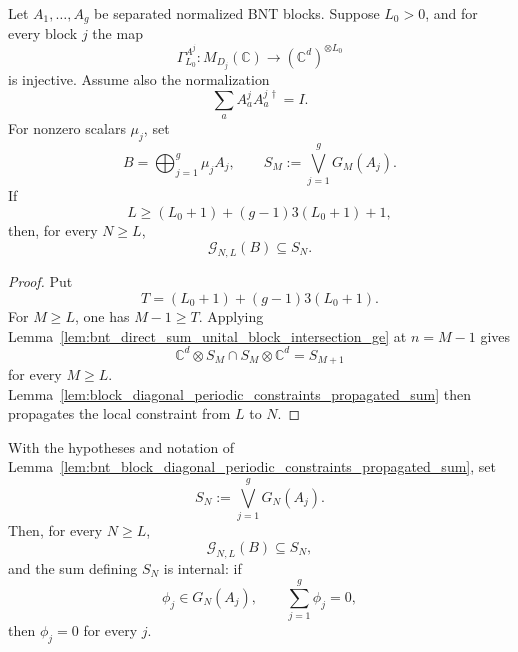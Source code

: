 \begin{lemma}
    \label{lem:bnt_block_diagonal_periodic_constraints_propagated_sum}
    \leanok
    Let \(A_1,\ldots,A_g\) be separated normalized BNT blocks. Suppose
    \(L_0>0\), and for every block \(j\) the map
    \[
        \Gamma_{L_0}^{A^j}:M_{D_j}(\mathbb C)\to
        (\mathbb C^d)^{\otimes L_0}
    \]
    is injective. Assume also the normalization
    \[
        \sum_a A^j_aA^{j\,\dagger}_a=I .
    \]
    For nonzero scalars \(\mu_j\), set
    \[
        B=\bigoplus_{j=1}^g\mu_jA_j,
        \qquad
        S_M:=\bigvee_{j=1}^gG_M(A_j).
    \]
    If
    \[
        L\ge (L_0+1)+(g-1)3(L_0+1)+1,
    \]
    then, for every \(N\ge L\),
    \[
        \mathcal G_{N,L}(B)\subseteq S_N.
    \]
\end{lemma}

\begin{proof}
    \leanok
    Put
    \[
        T=(L_0+1)+(g-1)3(L_0+1).
    \]
    For \(M\ge L\), one has \(M-1\ge T\). Applying
    Lemma~\ref{lem:bnt_direct_sum_unital_block_intersection_ge} at
    \(n=M-1\) gives
    \[
        \mathbb C^d\otimes S_M\cap S_M\otimes\mathbb C^d=S_{M+1}
    \]
    for every \(M\ge L\). Lemma~\ref{lem:block_diagonal_periodic_constraints_propagated_sum}
    then propagates the local constraint from \(L\) to \(N\).
\end{proof}

\begin{lemma}
    \label{lem:bnt_block_diagonal_periodic_constraints_internal_sum}
    \leanok
    With the hypotheses and notation of
    Lemma~\ref{lem:bnt_block_diagonal_periodic_constraints_propagated_sum}, set
    \[
        S_N:=\bigvee_{j=1}^gG_N(A_j).
    \]
    Then, for every $N\ge L$,
    \[
        \mathcal G_{N,L}(B)\subseteq S_N,
    \]
    and the sum defining \(S_N\) is internal: if
    \[
        \phi_j\in G_N(A_j),
        \qquad
        \sum_{j=1}^g\phi_j=0,
    \]
    then $\phi_j=0$ for every $j$.
\end{lemma}

